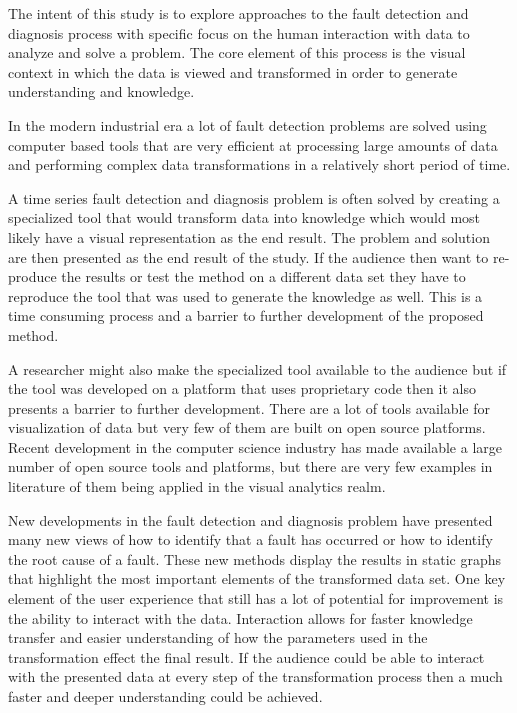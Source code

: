 The intent of this study is to explore approaches to the fault detection and diagnosis process with specific focus on the human interaction with data to analyze and solve a problem. The core element of this process is the visual context in which the data is viewed and transformed in order to generate understanding and knowledge.\par
In the modern industrial era a lot of fault detection problems are solved using computer based tools that are very efficient at processing large amounts of data and performing complex data transformations in a relatively short period of time.\par
A time series fault detection and diagnosis problem is often solved by creating a specialized tool that would transform data into knowledge which would most likely have a visual representation as the end result. The problem and solution are then presented as the end result of the study. If the audience then want to re-produce the results or test the method on a different data set they have to reproduce the tool that was used to generate the knowledge as well. This is a time consuming process and a barrier to further development of the proposed method.\par
A researcher might also make the specialized tool available to the audience but if the tool was developed on a platform that uses proprietary code then it also presents a barrier to further development. There are a lot of tools available for visualization of data but very few of them are built on open source platforms. Recent development in the computer science industry has made available a large number of open source tools and platforms, but there are very few examples in literature of them being applied in the visual analytics realm.\par
New developments in the fault detection and diagnosis problem have presented many new views of how to identify that a fault has occurred or how to identify the root cause of a fault. These new methods display the results in static graphs that highlight the most important elements of the transformed data set. One key element of the user experience that still has a lot of potential for improvement is the ability to interact with the data. Interaction allows for faster knowledge transfer and easier understanding of how the parameters used in the transformation effect the final result. If the audience could be able to interact with the presented data at every step of the transformation process then a much faster and deeper understanding could be achieved.\par

